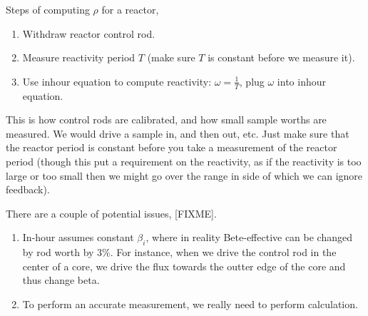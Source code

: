 \documentclass{school-22.211-notes}
\begin{document}
Steps of computing $\rho$ for a reactor, 
\begin{enumerate}
\item Withdraw reactor control rod.
\item Measure reactivity period $T$ (make sure $T$ is constant before we measure it).
\item Use inhour equation to compute reactivity: $\omega = \frac{1}{T}$, plug $\omega$ into inhour equation. 
\end{enumerate}
This is how control rods are calibrated, and how small sample worths are measured. We would drive a sample in, and then out, etc. Just make sure that the reactor period is constant before you take a measurement of the reactor period (though this put a requirement on the reactivity, as if the reactivity is too large or too small then we might go over the range in side of which we can ignore feedback). 


There are a couple of potential issues, [FIXME].
\begin{enumerate}
\item In-hour assumes constant $\beta_i$, where in reality Bete-effective can be changed by rod worth by 3\%. For instance, when we drive the control rod in the center of a core, we drive the flux towards the outter edge of the core and thus change beta. 

\item To perform an accurate measurement, we really need to perform calculation. 
\end{enumerate}
\end{document}
